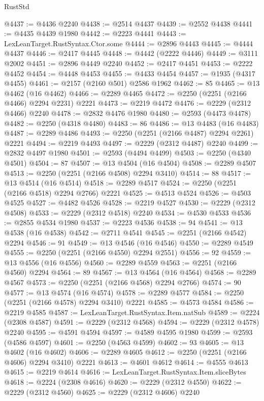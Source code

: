 \begin{lexlean}{RustStd}
\begin{coremodule}
{\begin{coremodule}
{{{{{{{{{{{{{{{{{{{{{{{{{{{{{{{{{{{{{{{{{{{{{{{{{{{{{@4437 := @4436 @2240
@4438 := @2514 @4437
@4439 := @2552 @4438
@4441 := @4435 @4439 @1980
@4442 := @2223 @4441
@4443 := LexLeanTarget.RustSyntax.Ctor.some
@4444 := @2896 @4443
@4445 := @4444 @4437
@4446 := @2417 @4445
@4448 := @4442 (@2222 @4446)
@4449 := @3111 @2002
@4451 := @2896 @4449 @2240
@4452 := @2417 @4451
@4453 := @2222 @4452
@4454 := @4448 @4453
@4455 := @4433 @4454
@4457 := @1935 (@4317 @4455)
@4461 := @2157 (@2160 @501) @2586 @1962
@4462 := 85
@4465 := @13 @4462 (@16 @4462)
@4466 := @2289 @4465
@4472 := @2250 (@2251 (@2166 @4466) @2294 @2231) @2221
@4473 := @2219 @4472
@4476 := @2229 (@2312 @4466) @2240
@4478 := @2832 @4476 @1980
@4480 := @2593 (@4473 @4478)
@4482 := @2250 (@4318 @4480)
@4483 := 86
@4486 := @13 @4483 (@16 @4483)
@4487 := @2289 @4486
@4493 := @2250 (@2251 (@2166 @4487) @2294 @2261) @2221
@4494 := @2219 @4493
@4497 := @2229 (@2312 @4487) @2240
@4499 := @2832 @4497 @1980
@4501 := @2593 (@4494 @4499)
@4503 := @2250 (@4340 @4501)
@4504 := 87
@4507 := @13 @4504 (@16 @4504)
@4508 := @2289 @4507
@4513 := @2250 (@2251 (@2166 @4508) @2294 @3410)
@4514 := 88
@4517 := @13 @4514 (@16 @4514)
@4518 := @2289 @4517
@4524 := @2250 (@2251 (@2166 @4518) @2294 @2766) @2221
@4525 := @4513 @4524
@4526 := @4503 @4525
@4527 := @4482 @4526
@4528 := @2219 @4527
@4530 := @2229 (@2312 @4508)
@4533 := @2229 (@2312 @4518) @2240
@4534 := @4530 @4533
@4536 := @2855 @4534 @1980
@4537 := @2223 @4536
@4538 := 94
@4541 := @13 @4538 (@16 @4538)
@4542 := @2711 @4541
@4545 := @2251 (@2166 @4542) @2294
@4546 := 91
@4549 := @13 @4546 (@16 @4546)
@4550 := @2289 @4549
@4555 := @2250 (@2251 (@2166 @4550) @2294 @2551)
@4556 := 92
@4559 := @13 @4556 (@16 @4556)
@4560 := @2289 @4559
@4563 := @2251 (@2166 @4560) @2294
@4564 := 89
@4567 := @13 @4564 (@16 @4564)
@4568 := @2289 @4567
@4573 := @2250 (@2251 (@2166 @4568) @2294 @2766)
@4574 := 90
@4577 := @13 @4574 (@16 @4574)
@4578 := @2289 @4577
@4584 := @2250 (@2251 (@2166 @4578) @2294 @3410) @2221
@4585 := @4573 @4584
@4586 := @2219 @4585
@4587 := LexLeanTarget.RustSyntax.Item.natSub
@4589 := @2224 (@2308 @4587)
@4591 := @2229 (@2312 @4568)
@4594 := @2229 (@2312 @4578) @2240
@4595 := @4591 @4594
@4597 := @4589 @4595 @1980
@4599 := @2593 (@4586 @4597)
@4601 := @2250 (@4563 @4599)
@4602 := 93
@4605 := @13 @4602 (@16 @4602)
@4606 := @2289 @4605
@4612 := @2250 (@2251 (@2166 @4606) @2294 @3410) @2221
@4613 := @4601 @4612
@4614 := @4555 @4613
@4615 := @2219 @4614
@4616 := LexLeanTarget.RustSyntax.Item.sliceBytes
@4618 := @2224 (@2308 @4616)
@4620 := @2229 (@2312 @4550)
@4622 := @2229 (@2312 @4560)
@4625 := @2229 (@2312 @4606) @2240
}}}}}}}}}}}}}}}}}}}}}}}}}}}}}}}}}}}}}}}}}}}}}}}}}}}}}
\end{coremodule}}
\end{coremodule}
\end{lexlean}
